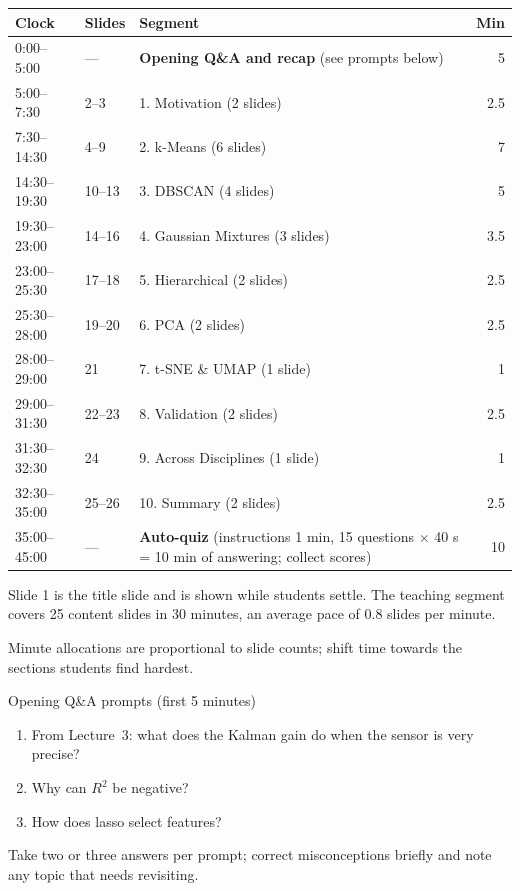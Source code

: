 \documentclass[11pt]{article}
\begin{document}
\begin{center}\small\renewcommand{\arraystretch}{1.2}\begin{tabularx}{\textwidth}{@{}l l X r@{}}\toprule\textbf{Clock} & \textbf{Slides} & \textbf{Segment} & \textbf{Min}\\\midrule

0:00--5:00 & --- & \textbf{Opening Q\&A and recap} (see prompts below) & 5\\

5:00--7:30 & 2--3 & 1. Motivation (2 slides) & 2.5\\

7:30--14:30 & 4--9 & 2. k-Means (6 slides) & 7\\

14:30--19:30 & 10--13 & 3. DBSCAN (4 slides) & 5\\

19:30--23:00 & 14--16 & 4. Gaussian Mixtures (3 slides) & 3.5\\

23:00--25:30 & 17--18 & 5. Hierarchical (2 slides) & 2.5\\

25:30--28:00 & 19--20 & 6. PCA (2 slides) & 2.5\\

28:00--29:00 & 21 & 7. t-SNE \& UMAP (1 slide) & 1\\

29:00--31:30 & 22--23 & 8. Validation (2 slides) & 2.5\\

31:30--32:30 & 24 & 9. Across Disciplines (1 slide) & 1\\

32:30--35:00 & 25--26 & 10. Summary (2 slides) & 2.5\\

35:00--45:00 & --- & \textbf{Auto-quiz} (instructions 1 min, 15 questions $\times$ 40 s = 10 min of answering; collect scores) & 10\\\bottomrule\end{tabularx}\end{center}

Slide 1 is the title slide and is shown while students settle. The teaching segment covers 25 content slides in 30 minutes, an average pace of 0.8 slides per minute. 

Minute allocations are proportional to slide counts; shift time towards the sections students find hardest.

\begin{instr}{Opening Q\&A prompts (first 5 minutes)}\begin{enumerate}\item From Lecture~3: what does the Kalman gain do when the sensor is very precise?\item Why can $R^2$ be negative?\item How does lasso select features?\end{enumerate}Take two or three answers per prompt; correct misconceptions briefly and note any topic that needs revisiting.\end{instr}
\end{document}
